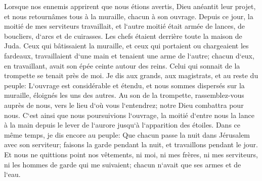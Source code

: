 \verse Lorsque nos ennemis apprirent que nous étions avertis, Dieu anéantit leur projet, et nous retournâmes tous à la muraille, chacun à son ouvrage. 
\verse Depuis ce jour, la moitié de mes serviteurs travaillait, et l`autre moitié était armée de lances, de boucliers, d`arcs et de cuirasses. Les chefs étaient derrière toute la maison de Juda. 
\verse Ceux qui bâtissaient la muraille, et ceux qui portaient ou chargeaient les fardeaux, travaillaient d`une main et tenaient une arme de l`autre; 
\verse chacun d`eux, en travaillant, avait son épée ceinte autour des reins. Celui qui sonnait de la trompette se tenait près de moi. 
\verse Je dis aux grands, aux magistrats, et au reste du peuple: L`ouvrage est considérable et étendu, et nous sommes dispersés sur la muraille, éloignés les uns des autres. 
\verse Au son de la trompette, rassemblez-vous auprès de nous, vers le lieu d`où vous l`entendrez; notre Dieu combattra pour nous. 
\verse C`est ainsi que nous poursuivions l`ouvrage, la moitié d`entre nous la lance à la main depuis le lever de l`aurore jusqu`à l`apparition des étoiles. 
\verse Dans ce même temps, je dis encore au peuple: Que chacun passe la nuit dans Jérusalem avec son serviteur; faisons la garde pendant la nuit, et travaillons pendant le jour. 
\verse Et nous ne quittions point nos vêtements, ni moi, ni mes frères, ni mes serviteurs, ni les hommes de garde qui me suivaient; chacun n`avait que ses armes et de l`eau. 

